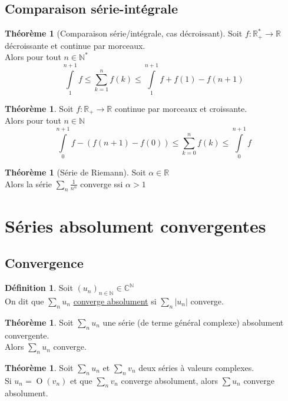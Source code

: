 \documentclass[10pt,a4paper]{article}
\theoremstyle{definition}
\newtheorem{theorem}[proposition]{Théorème}
\newtheorem{definition}[proposition]{Définition}
\DeclareMathOperator*{\dom}{O}
\begin{document}
\subsection{Comparaison série-intégrale}
\begin{theorem}[Comparaison série/intégrale, cas décroissant]
Soit $f: \mathbb{R}_+^* \to \mathbb{R}$ décroissante et continue par morceaux. \\
Alors pour tout $n \in \mathbb{N}^*$
\[\int\limits_1^{n + 1}f \leq \sum_{k = 1}^n f(k) \leq \int\limits_1^{n + 1}f + f(1) - f(n+1)\]
\end{theorem}
\begin{theorem}
Soit $f: \mathbb{R}_+ \to \mathbb{R}$ continue par morceaux et croissante. \\
Alors pour tout $n \in \mathbb{N}$
\[\int\limits_{0}^{n + 1} f - ( f(n + 1) - f(0)) \leq \sum_{k = 0}^n f(k) \leq \int\limits_{0}^{n + 1} f\]
\end{theorem}
\begin{theorem}[Série de Riemann]
Soit $\alpha \in \mathbb{R}$ \\
Alors la série $\sum\limits_n \frac{1}{n^\alpha}$ converge ssi $\alpha > 1$
\end{theorem}

\section{Séries absolument convergentes}
\subsection{Convergence}
\begin{definition}
Soit $(u_n)_{n \in \mathbb{N}} \in \mathbb{C}^\mathbb{N}$ \\
On dit que $\sum\limits_n u_n$ \uline{converge absolument} si $\sum\limits_n |u_n|$ converge.
\end{definition}
\begin{theorem}
Soit $\sum\limits_n u_n$ une série (de terme général complexe) absolument convergente. \\
Alors $\sum\limits_n u_n$ converge.
\end{theorem}
\begin{theorem}
Soit $\sum\limits_n u_n$ et $\sum\limits_n v_n$ deux séries à valeurs complexes. \\
Si $u_n = \dom(v_n)$ et que $\sum\limits_n v_n$ converge absolument, alors $\sum u_n$ converge absolument.
\end{theorem}
\end{document}
